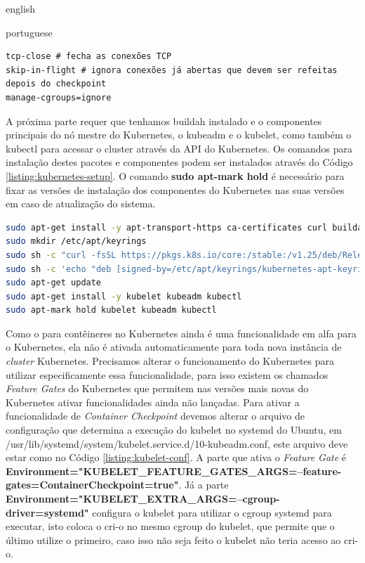 \begin{otherlanguage*}{english}
\begin{otherlanguage*}{portuguese}
\begin{lstlisting}[language=plaintext,caption={Configuração a ser incluída no arquivo de configurações do runc para o CRIU.},label={listing:runc-conf}]
tcp-close # fecha as conexões TCP
skip-in-flight # ignora conexões já abertas que devem ser refeitas depois do checkpoint
manage-cgroups=ignore
\end{lstlisting}

A próxima parte requer que tenhamos buildah instalado e o componentes principais do nó
mestre do Kubernetes, o kubeadm e o kubelet, como também o kubectl para acessar o cluster
através da  API do Kubernetes. Os comandos para instalação destes pacotes e componentes podem
ser instalados através do Código \ref{listing:kubernetes-setup}. O comando \textbf{sudo apt-mark hold}
é necessário para fixar as versões de instalação dos componentes do Kubernetes nas suas
versões em caso de atualização do sistema.

\begin{lstlisting}[language=bash,caption={Instalação dos pacotes necessários para Kubernetes e buildah.},label={listing:kubernetes-setup}]
sudo apt-get install -y apt-transport-https ca-certificates curl buildah make
sudo mkdir /etc/apt/keyrings
sudo sh -c "curl -fsSL https://pkgs.k8s.io/core:/stable:/v1.25/deb/Release.key | gpg --dearmor -o /etc/apt/keyrings/kubernetes-apt-keyring.gpg"
sudo sh -c 'echo "deb [signed-by=/etc/apt/keyrings/kubernetes-apt-keyring.gpg] https://pkgs.k8s.io/core:/stable:/v1.25/deb/ /" | tee /etc/apt/sources.list.d/kubernetes.list'
sudo apt-get update
sudo apt-get install -y kubelet kubeadm kubectl
sudo apt-mark hold kubelet kubeadm kubectl
\end{lstlisting}

Como o  para contêineres no Kubernetes ainda é uma funcionalidade em alfa para
o Kubernetes, ela não é ativada automaticamente para toda nova instância de \textit{cluster}
Kubernetes. Precisamos alterar o funcionamento do Kubernetes para utilizar especificamente essa
funcionalidade, para isso existem os chamados \textit{Feature Gates} do Kubernetes que permitem
nas versões mais novas do Kubernetes ativar funcionalidades ainda não lançadas. Para ativar a
funcionalidade de \textit{Container Checkpoint} devemos alterar o arquivo de configuração que
determina a execução do kubelet no systemd do Ubuntu, em
/usr/lib/systemd/system/kubelet.service.d/10-kubeadm.conf, este arquivo deve estar como no
Código \ref{listing:kubelet-conf}. A parte que ativa o \textit{Feature Gate} é
\textbf{Environment="KUBELET\_FEATURE\_GATES\_ARGS=--feature-gates=ContainerCheckpoint=true"}. Já
a parte \textbf{Environment="KUBELET\_EXTRA\_ARGS=--cgroup-driver=systemd"} configura o kubelet
para utilizar o cgroup systemd para executar, isto coloca o cri-o no mesmo cgroup do kubelet, 
que permite que o último utilize o primeiro, caso isso não seja feito o kubelet não teria acesso
ao cri-o.


\end{otherlanguage*}
\end{otherlanguage*}

